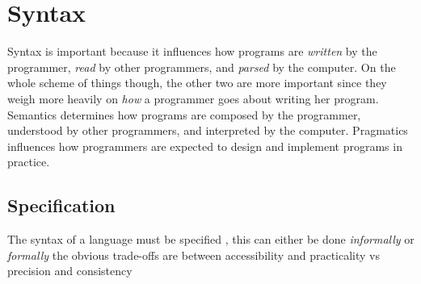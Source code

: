 
\section{Syntax}





\par{Syntax is important because it influences how programs are
\emph{written} by the programmer, \emph{read} by other programmers, and
\emph{parsed} by the computer. On the whole scheme of things though, the
other two are more important since they weigh more heavily on \emph{how}
a programmer goes about writing her program. Semantics determines how
programs are composed by the programmer, understood by other
programmers, and interpreted by the computer. Pragmatics influences how
programmers are expected to design and implement programs in practice.}



\subsection{Specification}

\par{The syntax of a language must be specified , this can either be done
\emph{informally} or \emph{formally} the obvious trade-offs are between
accessibility and practicality vs precision and consistency}




